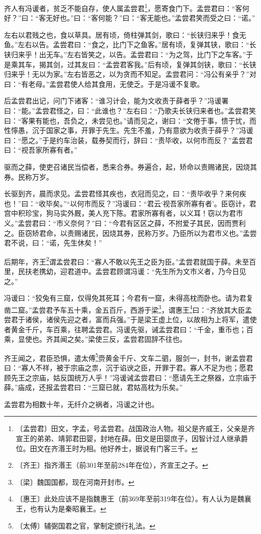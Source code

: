 \documentclass[12pt,UTF-8,openany,a4]{ctexbook}
\begin{document}
\begin{large}
    
    齐人有冯谖者，贫乏不能自存，使人属孟尝君\footnote{〔孟尝君〕\yiwen 田文，字孟，号孟尝君。战国政治人物。祖父是齐威王，父亲是齐宣王的弟弟、靖郭君田婴，封地在薛。田文是田婴庶子，因智计过人继承爵位。田文在齐湣王时为相。他好养士，据说有门客三千。}，愿寄食门下。孟尝君曰：“客何好？”曰：“客无好也。”曰：“客何能？”曰：“客无能也。”孟尝君笑而受之曰：“诺。”
    
    左右以君贱之也，食以草具。居有顷，倚柱弹其剑，歌曰：“长铗归来乎！食无鱼。”左右以告。孟尝君曰：“食之，比门下之鱼客。”居有顷，复弹其铗，歌曰：“长铗归来乎！出无车。”左右皆笑之，以告。孟尝君曰：“为之驾，比门下之车客。”于是乘其车，揭其剑，过其友曰：“孟尝君客我。”后有顷，复弹其剑铗，歌曰：“长铗归来乎！无以为家。”左右皆恶之，以为贪而不知足。孟尝君问：“冯公有亲乎？”对曰：“有老母。”孟尝君使人给其食用，无使乏。于是冯谖不复歌。
    
    后孟尝君出记，问门下诸客：“谁习计会，能为文收责于薛者乎？”冯谖署曰：“能。”孟尝君怪之，曰：“此谁也？”左右曰：“乃歌夫长铗归来者也。”孟尝君笑曰：“客果有能也，吾负之，未尝见也。”请而见之，谢曰：“文倦于事，愦于忧，而性懧愚，沉于国家之事，开罪于先生。先生不羞，乃有意欲为收责于薛乎？”冯谖曰：“愿之。”于是约车治装，载券契而行，辞曰：“责毕收，以何市而反？”孟尝君曰：“视吾家所寡有者。”
    
    驱而之薛，使吏召诸民当偿者，悉来合券。券遍合，起，矫命以责赐诸民，因烧其券。民称万岁。
    
    长驱到齐，晨而求见。孟尝君怪其疾也，衣冠而见之，曰：“责毕收乎？来何疾也！”曰：“收毕矣。”“以何市而反？”冯谖曰：“君云‘视吾家所寡有者’。臣窃计，君宫中积珍宝，狗马实外厩，美人充下陈。君家所寡有者，以义耳！窃以为君市义。”孟尝君曰：“市义奈何？”曰：“今君有区区之薛，不拊爱子其民，因而贾利之。臣窃矫君命，以责赐诸民，因烧其券，民称万岁。乃臣所以为君市义也。”孟尝君不说，曰：“诺，先生休矣！”
    
    后期年，齐王\footnote{〔齐王〕\yiwen 指齐湣王（前301年至前284年在位），齐宣王之子。}谓孟尝君曰：“寡人不敢以先王之臣为臣。”孟尝君就国于薛。未至百里，民扶老携幼，迎君道中。孟尝君顾谓冯谖：“先生所为文市义者，乃今日见之。”
    
    冯谖曰：“狡兔有三窟，仅得免其死耳；今君有一窟，未得高枕而卧也。请为君复凿二窟。”孟尝君予车五十乘，金五百斤，西游于梁\footnote{〔梁〕\yiwen 魏国国都，现在河南开封市。}，谓惠王\footnote{〔惠王〕\yiwen 此处应该不是指魏惠王（前369年至前319年在位）。有人认为是魏襄王，也有认为是秦昭襄王。}曰：“齐放其大臣孟尝君于诸侯，诸侯先迎之者，富而兵强。”于是梁王虚上位，以故相为上将军，遣使者黄金千斤，车百乘，往聘孟尝君。冯谖先驱，诫孟尝君曰：“千金，重币也；百乘，显使也。齐其闻之矣。”梁使三反，孟尝君固辞不往也。
    
    齐王闻之，君臣恐惧，遣太傅\footnote{〔太傅〕\yiwen 辅弼国君之官，掌制定颁行礼法。}赍黄金千斤、文车二驷，服剑一，封书，谢孟尝君曰：“寡人不祥，被于宗庙之祟，沉于谄谀之臣，开罪于君。寡人不足为也；愿君顾先王之宗庙，姑反国统万人乎！”冯谖诫孟尝君曰：“愿请先王之祭器，立宗庙于薛。”庙成，还报孟尝君曰：“三窟已就，君姑高枕为乐矣。”
    
    孟尝君为相数十年，无纤介之祸者，冯谖之计也。
\end{large}
\end{document}
